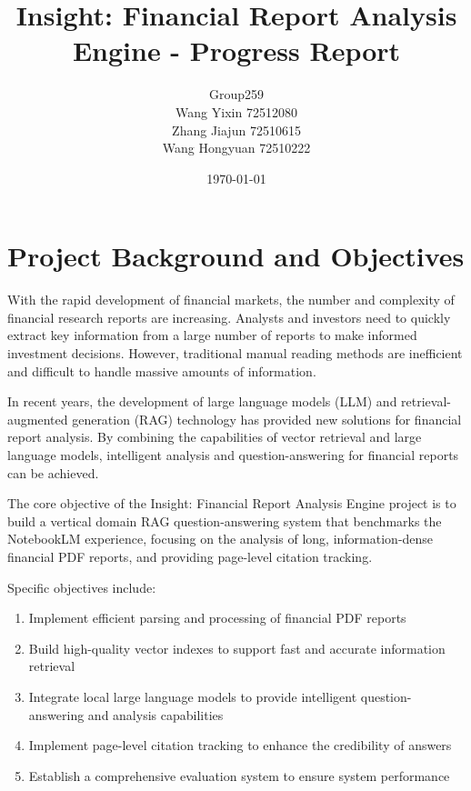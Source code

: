 \documentclass[12pt, a4paper]{article}
\begin{document}
\title{Insight: Financial Report Analysis Engine - Progress Report}
\author{
    Group259 \\
    Wang Yixin 72512080 \\
    Zhang Jiajun 72510615 \\
    Wang Hongyuan 72510222
}
\date{\today}

\maketitle

\section{Project Background and Objectives}

With the rapid development of financial markets, the number and complexity of
financial research reports are increasing. Analysts and investors need to
quickly extract key information from a large number of reports to make informed
investment decisions. However, traditional manual reading methods are
inefficient and difficult to handle massive amounts of information.

In recent years, the development of large language models (LLM) and
retrieval-augmented generation (RAG) technology has provided new solutions for
financial report analysis. By combining the capabilities of vector retrieval
and large language models, intelligent analysis and question-answering for
financial reports can be achieved.

The core objective of the Insight: Financial Report Analysis Engine project is
to build a vertical domain RAG question-answering system that benchmarks the
NotebookLM experience, focusing on the analysis of long, information-dense
financial PDF reports, and providing page-level citation tracking.

Specific objectives include:
\begin{enumerate}
    \item Implement efficient parsing and processing of financial PDF reports
    \item Build high-quality vector indexes to support fast and accurate information
          retrieval
    \item Integrate local large language models to provide intelligent question-answering
          and analysis capabilities
    \item Implement page-level citation tracking to enhance the credibility of answers
    \item Establish a comprehensive evaluation system to ensure system performance
\end{enumerate}
\end{document}
